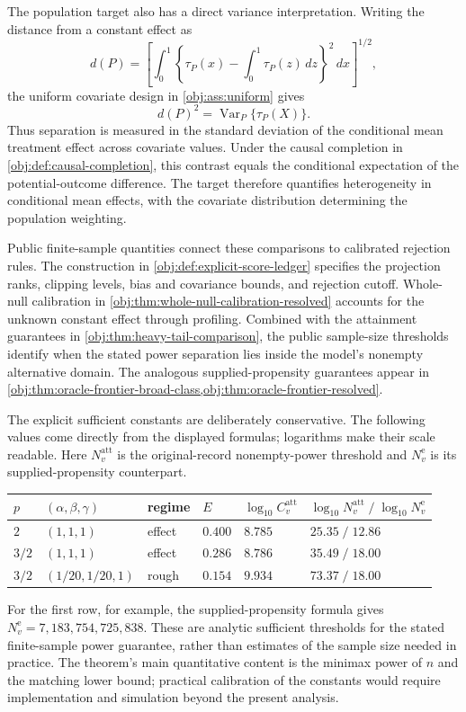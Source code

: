 The population target also has a direct variance interpretation. Writing the distance from a constant effect as
\[
d(P)=
\left[
\int_0^1
\left\{\tau_P(x)-\int_0^1\tau_P(z)\,dz\right\}^{2}\,dx
\right]^{1/2},
\]
the uniform covariate design in \cref{obj:ass:uniform} gives
\[
d(P)^2=\operatorname{Var}_{P}\{\tau_P(X)\}.
\]
Thus separation is measured in the standard deviation of the conditional mean treatment effect across covariate values. Under the causal completion in \cref{obj:def:causal-completion}, this contrast equals the conditional expectation of the potential-outcome difference. The target therefore quantifies heterogeneity in conditional mean effects, with the covariate distribution determining the population weighting.

Public finite-sample quantities connect these comparisons to calibrated rejection rules. The construction in \cref{obj:def:explicit-score-ledger} specifies the projection ranks, clipping levels, bias and covariance bounds, and rejection cutoff. Whole-null calibration in \cref{obj:thm:whole-null-calibration-resolved} accounts for the unknown constant effect through profiling. Combined with the attainment guarantees in \cref{obj:thm:heavy-tail-comparison}, the public sample-size thresholds identify when the stated power separation lies inside the model's nonempty alternative domain. The analogous supplied-propensity guarantees appear in \cref{obj:thm:oracle-frontier-broad-class,obj:thm:oracle-frontier-resolved}.

The explicit sufficient constants are deliberately conservative. The following values come directly from the displayed formulas; logarithms make their scale readable. Here \(N_v^{\mathrm{att}}\) is the original-record nonempty-power threshold and \(N_v^{\mathrm e}\) is its supplied-propensity counterpart.
\begin{center}
\begin{tabular}{llllll}
\hline
\(p\) & \((\alpha,\beta,\gamma)\) & regime & \(E\) & \(\log_{10}C_v^{\mathrm{att}}\) & \(\log_{10}N_v^{\mathrm{att}}\; /\;\log_{10}N_v^{\mathrm e}\) \\
\hline
\(2\) & \((1,1,1)\) & effect & \(0.400\) & \(8.785\) & \(25.35\;/\;12.86\) \\
\(3/2\) & \((1,1,1)\) & effect & \(0.286\) & \(8.786\) & \(35.49\;/\;18.00\) \\
\(3/2\) & \((1/20,1/20,1)\) & rough & \(0.154\) & \(9.934\) & \(73.37\;/\;18.00\) \\
\hline
\end{tabular}
\end{center}
For the first row, for example, the supplied-propensity formula gives \(N_v^{\mathrm e}=7{,}183{,}754{,}725{,}838\). These are analytic sufficient thresholds for the stated finite-sample power guarantee, rather than estimates of the sample size needed in practice. The theorem's main quantitative content is the minimax power of \(n\) and the matching lower bound; practical calibration of the constants would require implementation and simulation beyond the present analysis.

